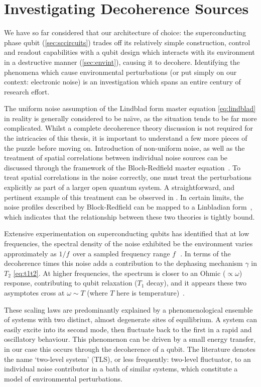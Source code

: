 \section{Investigating Decoherence Sources}

We have so far considered that our architecture of choice: the superconducting phase qubit (\cref{sec:sccircuits}) trades off its relatively simple construction, control and readout capabilities with a qubit design which interacts with its environment in a destructive manner (\cref{sec:envint}), causing it to decohere.
Identifying the phenomena which cause environmental perturbations (or put simply on our context: electronic noise) is an investigation which spans an entire century of research effort.

The uniform noise assumption of the Lindblad form master equation \cref{eq:lindblad} in reality is generally considered to be na\"{\i}ve, as the situation tends to be far more complicated.
Whilst a complete decoherence theory discussion is not required for the intricacies of this thesis, it is important to understand a few more pieces of the puzzle before moving on.
Introduction of non-uniform noise, as well as the treatment of spatial correlations between individual noise sources can be discussed through the framework of the Bloch-Redfield master equation~\cite{Carmichael1999}.
To treat spatial correlations in the noise correctly, one must treat the perturbations explicitly as part of a larger open quantum system. A straightforward, and pertinent example of this treatment can be observed in .
In certain limits, the noise profiles described by Block-Redfield can be mapped to a Linbladian form~\cite{Jeske2013, Jeske2015}, which indicates that the relationship between these two theories is tightly bound.

Extensive experimentation on superconducting qubits has identified that at low frequencies, the spectral density of the noise exhibited be the environment varies approximately as $1/f\,$ over a sampled frequency range $f\,$~\cite{Dutta1981}.
In terms of the decoherence times this noise adds a contribution to the dephasing mechanism $\gamma$ in $T_2$ \cref{eq:t1t2}.
At higher frequencies, the spectrum is closer to an Ohmic ($\propto \omega$) response, contributing to qubit relaxation ($T_1$ decay), and it appears these two asymptotes cross at $\omega \sim T$ (where $T$ here is temperature)~\cite{Astafiev2004}.

These scaling laws are predominantly explained by a phenomenological ensemble of systems with two distinct, almost degenerate sites of equilibrium.
A system can easily excite into its second mode, then fluctuate back to the first in a rapid and oscillatory behaviour.
This phenomenon can be driven by a small energy transfer, in our case this occurs through the decoherence of a qubit.
The literature denotes the name `two-level system' (TLS), or less frequently: two-level fluctuator, to an individual noise contributor in a bath of similar systems, which constitute a model of environmental perturbations.

